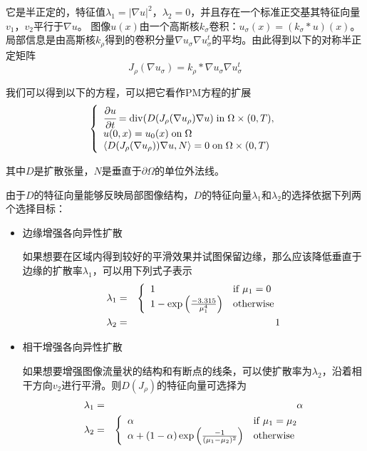 \documentclass[a4paper,12pt]{article}
\begin{document}
它是半正定的，特征值$\lambda_1=|\nabla u|^2$，$\lambda_2=0$，并且存在一个标准正交基其特征向量$v_1$，$v_2$平行于$\nabla u$。
图像$u(x)$由一个高斯核$k_{\sigma}$卷积：$u_{\sigma}(x)=(k_{\sigma}\ast u)(x)$。局部信息是由高斯核$k_{\rho}$得到的卷积分量$\nabla u_{\sigma}\nabla u_{\sigma}^t$的平均。由此得到以下的对称半正定矩阵
\begin{displaymath}
J_{\rho}(\nabla u_{\sigma})=k_{\rho}\ast\nabla u_{\sigma}\nabla u_{\sigma}^t
\end{displaymath}

我们可以得到以下的方程，可以把它看作PM方程的扩展
\begin{displaymath}
\left\{\begin{array}{lll}
\cfrac{\partial u}{\partial t}=\mathrm{div}(D(J_{\rho}(\nabla u_{\rho})\nabla u) \; \mathrm{in}\; \Omega\times(0,T),\\
u(0,x)=u_0(x) \; \mathrm{on}\; \Omega\\
\langle D(J_{\rho}(\nabla u_{\rho}))\nabla u, N\rangle=0 \;\mathrm{on}\; \Omega\times(0,T)
\end{array}\right.
\end{displaymath}

其中$D$是扩散张量，$N$是垂直于$\partial \Omega$的单位外法线。

由于$D$的特征向量能够反映局部图像结构，$D$的特征向量$\lambda_1$和$\lambda_2$的选择依据下列两个选择目标：
\begin{itemize}
\item 边缘增强各向异性扩散

如果想要在区域内得到较好的平滑效果并试图保留边缘，那么应该降低垂直于边缘的扩散率$\lambda_1$，可以用下列式子表示
\begin{eqnarray*}
\lambda_1&=&\left\{\begin{array}{ll}
1 & \mathrm{if} \;\mu_1=0\\
1-\exp\Big{(}\frac{-3.315}{\mu_1^4}\Big{)} & \mathrm{otherwise}
\end{array}\right.\\
\lambda_2&=&1
\end{eqnarray*}

\item 相干增强各向异性扩散

如果想要增强图像流量状的结构和有断点的线条，可以使扩散率为$\lambda_2$，沿着相干方向$v_2$进行平滑。则$D(J_{\rho})$的特征向量可选择为
\begin{eqnarray*}
\lambda_1&=&\alpha\\
\lambda_2&=&\left\{\begin{array}{ll}
\alpha & \mathrm{if} \;\mu_1=\mu_2\\
\alpha+(1-\alpha)\exp\Big{(}\frac{-1}{(\mu_1-\mu_2)^2}\Big{)} & \mathrm{otherwise}
\end{array}\right.
\end{eqnarray*}

\end{itemize}
\end{document}
